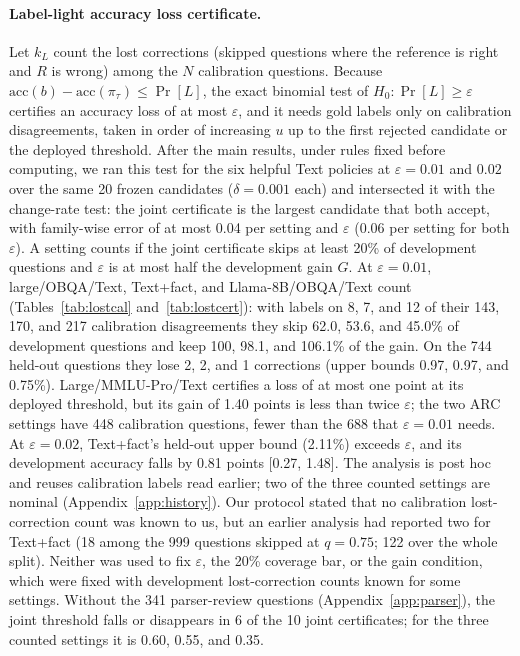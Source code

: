 \paragraph{Label-light accuracy loss certificate.} Let $k_L$ count the lost corrections (skipped questions where the reference is right and $R$ is wrong) among the $N$ calibration questions. Because $\mathrm{acc}(b)-\mathrm{acc}(\pi_\tau)\le\Pr[L]$, the exact binomial test of $H_0:\Pr[L]\ge\varepsilon$ certifies an accuracy loss of at most $\varepsilon$, and it needs gold labels only on calibration disagreements, taken in order of increasing $u$ up to the first rejected candidate or the deployed threshold. After the main results, under rules fixed before computing, we ran this test for the six helpful Text policies at $\varepsilon=0.01$ and $0.02$ over the same 20 frozen candidates ($\delta=0.001$ each) and intersected it with the change-rate test: the joint certificate is the largest candidate that both accept, with family-wise error of at most 0.04 per setting and $\varepsilon$ (0.06 per setting for both $\varepsilon$). A setting counts if the joint certificate skips at least 20\% of development questions and $\varepsilon$ is at most half the development gain $G$. At $\varepsilon=0.01$, large/OBQA/Text, Text+fact, and Llama-8B/OBQA/Text count (Tables~\ref{tab:lostcal} and~\ref{tab:lostcert}): with labels on 8, 7, and 12 of their 143, 170, and 217 calibration disagreements they skip 62.0, 53.6, and 45.0\% of development questions and keep 100, 98.1, and 106.1\% of the gain. On the 744 held-out questions they lose 2, 2, and 1 corrections (upper bounds 0.97, 0.97, and 0.75\%). Large/MMLU-Pro/Text certifies a loss of at most one point at its deployed threshold, but its gain of 1.40 points is less than twice $\varepsilon$; the two ARC settings have 448 calibration questions, fewer than the 688 that $\varepsilon=0.01$ needs. At $\varepsilon=0.02$, Text+fact's held-out upper bound (2.11\%) exceeds $\varepsilon$, and its development accuracy falls by 0.81 points [0.27, 1.48]. The analysis is post hoc and reuses calibration labels read earlier; two of the three counted settings are nominal (Appendix~\ref{app:history}). Our protocol stated that no calibration lost-correction count was known to us, but an earlier analysis had reported two for Text+fact (18 among the 999 questions skipped at $q=0.75$; 122 over the whole split). Neither was used to fix $\varepsilon$, the 20\% coverage bar, or the gain condition, which were fixed with development lost-correction counts known for some settings. Without the 341 parser-review questions (Appendix~\ref{app:parser}), the joint threshold falls or disappears in 6 of the 10 joint certificates; for the three counted settings it is 0.60, 0.55, and 0.35.

